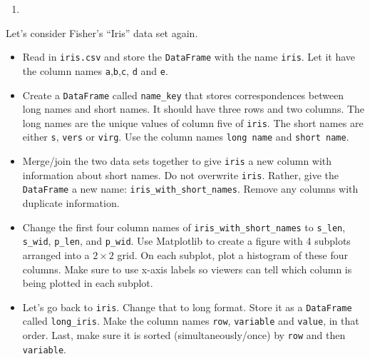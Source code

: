 \documentclass[12pt,krantz2]{krantz}
\providecommand{\tightlist}{%
  \setlength{\itemsep}{0pt}\setlength{\parskip}{0pt}}
\begin{document}
\begin{enumerate}
\def\labelenumi{\arabic{enumi}.}
\setcounter{enumi}{3}
\item
\end{enumerate}

Let's consider Fisher's ``Iris'' data set \citep{misc_iris_53} again.

\begin{itemize}
\tightlist
\item
  Read in \texttt{iris.csv} and store the \texttt{DataFrame} with the name \texttt{iris}. Let it have the column names \texttt{\textquotesingle{}a\textquotesingle{}},\texttt{\textquotesingle{}b\textquotesingle{}},\texttt{\textquotesingle{}c\textquotesingle{}}, \texttt{\textquotesingle{}d\textquotesingle{}} and \texttt{\textquotesingle{}e\textquotesingle{}}.
\item
  Create a \texttt{DataFrame} called \texttt{name\_key} that stores correspondences between long names and short names. It should have three rows and two columns. The long names are the unique values of column five of \texttt{iris}. The short names are either \texttt{\textquotesingle{}s\textquotesingle{}}, \texttt{\textquotesingle{}vers\textquotesingle{}} or \texttt{\textquotesingle{}virg\textquotesingle{}}. Use the column names \texttt{\textquotesingle{}long\ name\textquotesingle{}} and \texttt{\textquotesingle{}short\ name\textquotesingle{}}.
\item
  Merge/join the two data sets together to give \texttt{iris} a new column with information about short names. Do not overwrite \texttt{iris}. Rather, give the \texttt{DataFrame} a new name: \texttt{iris\_with\_short\_names}. Remove any columns with duplicate information.
\item
  Change the first four column names of \texttt{iris\_with\_short\_names} to \texttt{s\_len}, \texttt{s\_wid}, \texttt{p\_len}, and \texttt{p\_wid}. Use Matplotlib to create a figure with 4 subplots arranged into a \(2 \times 2\) grid. On each subplot, plot a histogram of these four columns. Make sure to use x-axis labels so viewers can tell which column is being plotted in each subplot.
\item
  Let's go back to \texttt{iris}. Change that to long format. Store it as a \texttt{DataFrame} called \texttt{long\_iris}. Make the column names \texttt{row}, \texttt{variable} and \texttt{value}, in that order. Last, make sure it is sorted (simultaneously/once) by \texttt{row} and then \texttt{variable}.
\end{itemize}
\end{document}
